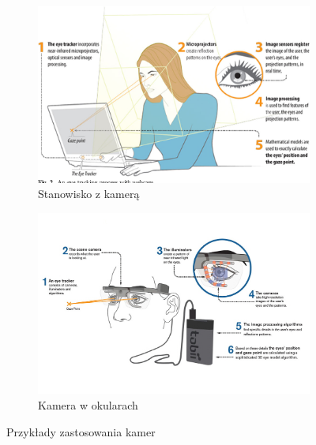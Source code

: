 \begin{figure}[H]
    \centering
    \begin{subfigure}{.5\textwidth}
      \centering
      \includegraphics[width=\linewidth]{resources/camera.png}
      \caption{Stanowisko z kamerą}
      \label{fig:camerassub1}
    \end{subfigure}%
    \begin{subfigure}{.5\textwidth}
      \centering
      \includegraphics[width=\linewidth]{resources/glasses.jpg}
      \caption{Kamera w okularach}
      \label{fig:camerassub2}
    \end{subfigure}
    \caption{Przykłady zastosowania kamer}
    \label{fig:cameras}
\end{figure}

